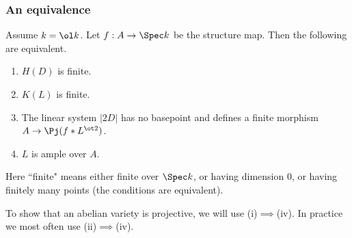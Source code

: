 \subsubsection{An equivalence}
\begin{pr}
Assume $k=\ol k$. Let $f:A\to\Spec k$ be the structure map.
Then the following are equivalent.
\begin{enumerate}
\item
$H(D)$ is finite.
\item
$K(L)$ is finite. 
\item %
The linear system $|2D|$ has no basepoint and defines a finite morphism $A\to \Pj(f*L^{\ot 2})$. %
\item
$L$ is ample over $A$. 
\end{enumerate}
Here ``finite" means either finite over $\Spec k$, or having dimension 0, or having finitely many points (the conditions are equivalent).
\end{pr}
\begin{rem}
To show that an abelian variety is projective, we will use (i)$\implies $(iv). In practice we most often use (ii)$\implies$(iv).
\end{rem}
